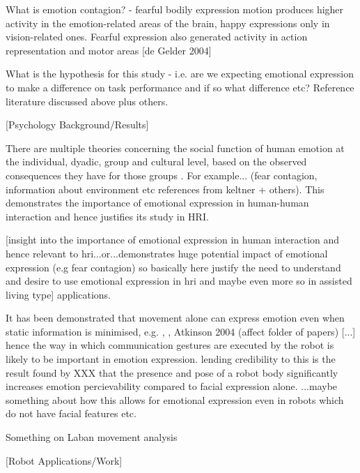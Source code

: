 \documentclass[]{article}
\begin{document}
What is emotion contagion?
- fearful bodily expression motion produces higher activity in the emotion-related areas of the brain, happy expressions only in vision-related ones. Fearful expression also generated activity in action representation and motor areas [de Gelder 2004]

What is the hypothesis for this study - i.e. are we expecting emotional expression to make a difference on task performance and if so what difference etc? Reference literature discussed above plus others. 

[Psychology Background/Results]

There are multiple theories concerning the social function of human emotion at the individual, dyadic, group and cultural level, based on the observed consequences they have for those groups \cite{keltner1999social}. For example... (fear contagion, information about environment etc references from keltner + others). This demonstrates the importance of emotional expression in human-human interaction and hence justifies its study in HRI. 

[insight into the importance of emotional expression in human interaction and hence relevant to hri...or...demonstrates huge potential impact of emotional expression (e.g fear contagion) so basically here justify the need to understand and desire to use emotional expression in hri and maybe even more so in assisted living type] applications.

It has been demonstrated that movement alone can express emotion even when static information is minimised, e.g. \cite{dittrich1996perception}, \cite{pollick2001perceiving}, Atkinson 2004 (affect folder of papers) [...] hence the way in which communication gestures are executed by the robot is likely to be important in emotion expression. lending credibility to this is the result found by XXX that the presence and pose of a robot body significantly increases emotion percievability compared to facial expression alone. ...maybe something about how this allows for emotional expression even in robots which do not have facial features etc.  

Something on Laban movement analysis

[Robot Applications/Work]
\end{document}
